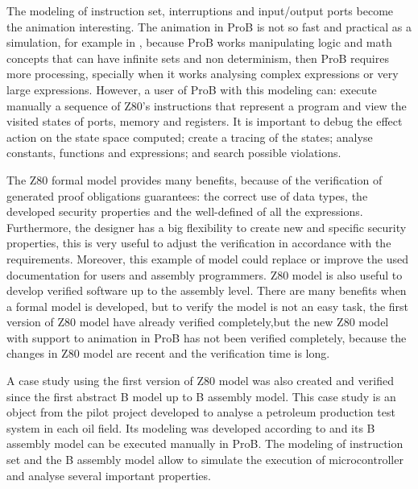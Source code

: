 \documentclass[a4paper]{llncs}
\begin{document}
The modeling of instruction set, interruptions and input/output ports become the
animation interesting. The animation in ProB is not so fast and practical as a
simulation, for example in \cite{Simulator_z80}, because ProB works manipulating
logic and math concepts that can have infinite sets and non determinism, then
ProB requires more processing, specially when it works analysing  complex
expressions or very large expressions. However, a user of ProB with this modeling
can: execute manually a sequence of Z80's instructions that represent a program
and view the visited states of ports, memory and registers. It is important to
debug the effect action on the state space computed; create a tracing of the
states; analyse constants, functions and expressions; and search possible
violations.





The Z80 formal model provides many benefits, because of the verification of
generated proof obligations guarantees: the correct use of data types, the developed
security properties  and the well-defined of all the expressions. %
Furthermore, the designer has a big flexibility to create new and specific security properties, this is very useful
to adjust the verification in accordance with the requirements. Moreover, this
example of model could replace or improve the used documentation for users and
assembly programmers. Z80 model is also useful to develop verified software 
up to the assembly level. There are many benefits when a formal model is
developed, but to verify the model is not an easy task, the first version of Z80 model have already verified completely,but the new Z80 model with support to animation in ProB has not been verified completely,
because the changes in Z80 model are recent and the verification time is long.

A case study using the first version of Z80 model was also created and verified
since the first abstract B model up to B assembly model. This case study is an
object from the pilot project developed to analyse a petroleum production test
system in each oil field. Its modeling was developed according to \cite{LAUT_SERGIO}
and its B assembly model can be executed manually in ProB. The modeling of
instruction set and the B assembly model allow to simulate the execution of microcontroller
and analyse several important properties.
\end{document}
